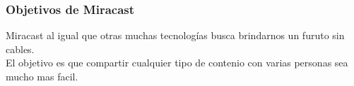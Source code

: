 \begin{frame}
  \frametitle{Objetivos de Miracast}
  Miracast al igual que otras muchas tecnologías busca brindarnos un furuto sin cables.\\
  El objetivo es que compartir cualquier tipo de contenio con varias personas sea mucho mas facil.
\end{frame}
